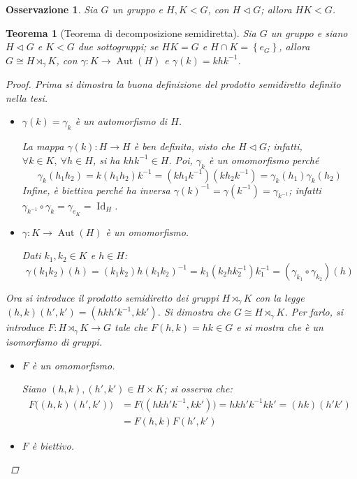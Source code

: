 \documentclass[12pt]{scrartcl}
\theoremstyle{style}
\newtheorem{teorema}{Teorema}[section]
\newtheorem{osservazione}{Osservazione}[section]
\numberwithin{equation}{subsection}
\begin{document}
\begin{osservazione}
	Sia $G$ un gruppo e $H,K < G$, con $H \lhd G$; allora $HK < G$.
\end{osservazione}
\begin{teorema}
	[Teorema di decomposizione semidiretta]\label{scth}
	Sia $G$ un gruppo e siano $H \lhd G$ e $K < G$ due sottogruppi; se $HK = G$ e $H \cap K = \left\{ e_G \right\} $, allora $G \cong H \rtimes _\gamma K$, con $\gamma: K \to \operatorname{Aut} (H)$ e $\gamma(k) = k hk^{-1}$.
	\begin{proof}
		Prima si dimostra la buona definizione del prodotto semidiretto definito nella tesi.
		\begin{itemize}
			\item $\gamma(k)=\gamma_k$ \`e un automorfismo di $H$.

				La mappa $\gamma(k):H\to H$ \`e ben definita, visto che $H\lhd G$; infatti, $\forall k \in  K, \ \forall h \in H$, si ha $k h k^{-1}\in H$.
				Poi, $\gamma_k$ \`e un omomorfismo perch\'e
				\[
				\gamma_k (h_1h_2) = k (h_1h_2) k^{-1} = (kh_1k^{-1})(k h_2k^{-1}) = \gamma_k(h_1) \gamma_k(h_2)
				\] 
				Infine, \`e biettiva perch\'e ha inversa $\gamma(k)^{-1} =\gamma(k^{-1})= \gamma_{k^{-1}} $; infatti $\gamma_{k^{-1}} \circ \gamma_k = \gamma_{e_K}  = \operatorname{Id} _H$.
			\item $\gamma : K \to \operatorname{Aut} (H)$ \`e un omomorfismo.

				Dati $k_1,k_2 \in K$ e $h \in H$:
\[
\gamma(k_1k_2)(h) = (k_1k_2)h(k_1k_2)^{-1} = k_1(k_2hk_2^{-1})k_1^{-1}= (\gamma_{k_1} \circ \gamma_{k_2} )(h)
\] 
		\end{itemize}
		Ora si introduce il prodotto semidiretto dei gruppi $H \rtimes _\gamma K$ con la legge $(h,k)(h',k') = (hkh'k^{-1},k k')$.
		Si dimostra che $G \cong H \rtimes _\gamma K$.
		Per farlo, si introduce $F : H \rtimes _\gamma K \to G$ tale che $F(h,k) = hk \in G$ e si mostra che \`e un isomorfismo di gruppi.
		\begin{itemize}
			\item $F$ \`e un omomorfismo.

				Siano $(h,k), (h',k') \in H \times K$; si osserva che:
				\[
					\begin{split}
						F\big((h,k)(h',k')\big) &= F\big((hkh'k^{-1},k k')\big) = hkh'k^{-1} k k'= (hk)(h'k')\\
									&= F(h,k) F(h',k')
					\end{split}
				\] 
			\item $F$ \`e biettivo.


\end{itemize}
\end{proof}
\end{teorema}
\end{document}
